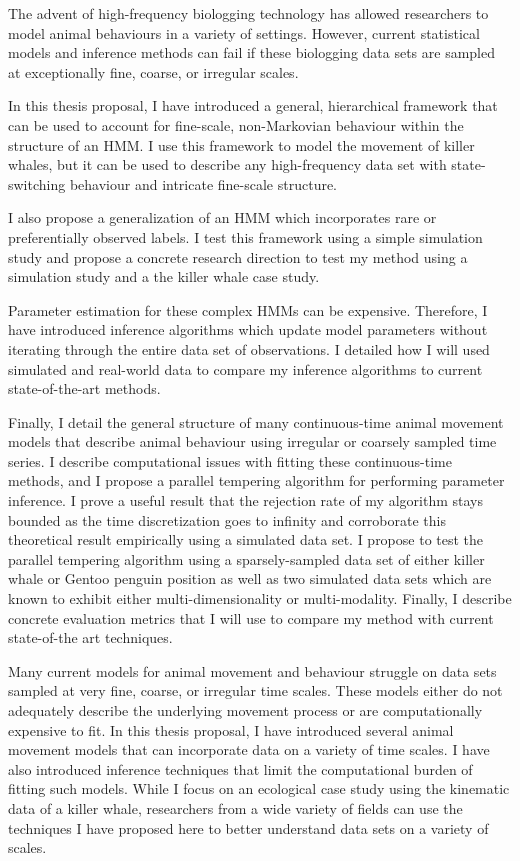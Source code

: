 The advent of high-frequency biologging technology has allowed researchers to model animal behaviours in a variety of settings. However, current statistical models and inference methods can fail if these biologging data sets are sampled at exceptionally fine, coarse, or irregular scales.

In this thesis proposal, I have introduced a general, hierarchical framework that can be used to account for fine-scale, non-Markovian behaviour within the structure of an HMM. I use this framework to model the movement of killer whales, but it can be used to describe any high-frequency data set with state-switching behaviour and intricate fine-scale structure. 

I also propose a generalization of an HMM which incorporates rare or preferentially observed labels. I test this framework using a simple simulation study and propose a concrete research direction to test my method using a simulation study and a the killer whale case study.

Parameter estimation for these complex HMMs can be expensive. Therefore, I have introduced inference algorithms which update model parameters without iterating through the entire data set of observations. I detailed how I will used simulated and real-world data to compare my inference algorithms to current state-of-the-art methods.

Finally, I detail the general structure of many continuous-time animal movement models that describe animal behaviour using irregular or coarsely sampled time series. I describe computational issues with fitting these continuous-time methods, and I propose a parallel tempering algorithm for performing parameter inference. I prove a useful result that the rejection rate of my algorithm stays bounded as the time discretization goes to infinity and corroborate this theoretical result empirically using a simulated data set. I propose to test the parallel tempering algorithm using a sparsely-sampled data set of either killer whale or Gentoo penguin position as well as two simulated data sets which are known to exhibit either multi-dimensionality or multi-modality. Finally, I describe concrete evaluation metrics that I will use to compare my method with current state-of-the art techniques.

Many current models for animal movement and behaviour struggle on data sets sampled at very fine, coarse, or irregular time scales. These models either do not adequately describe the underlying movement process or are computationally expensive to fit. In this thesis proposal, I have introduced several animal movement models that can incorporate data on a variety of time scales. I have also introduced inference techniques that limit the computational burden of fitting such models. While I focus on an ecological case study using the kinematic data of a killer whale, researchers from a wide variety of fields can use the techniques I have proposed here to better understand data sets on a variety of scales.

\fi